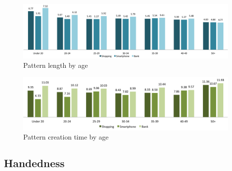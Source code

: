   	\begin{figure}[H]
	    \centering
	    \includegraphics[width=\textwidth]{pics/analysis/avgpatternlength-age.png}
	    \caption{Pattern length by age}
	    \label{fig:patternlengthage}
  	\end{figure}

  	\begin{figure}[H]
	    \centering
	    \includegraphics[width=\textwidth]{pics/analysis/creationtime-age.png}
	    \caption{Pattern creation time by age}
	    \label{fig:patterncreationtimeage}
  	\end{figure}

	\subsection{Handedness}

